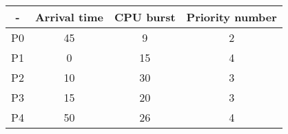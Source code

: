 \begin{enumerate}
	\begin{latin}
		\begin{center}
			\begin{tabular}{||c| c c c||} 
				\hline
				- & Arrival time & ‫‪CPU burst & ‫‪Priority‬‬ ‫‪number‬‬ \\ [0.5ex] 
				\hline\hline
				P0 & 45 & 9 & 2 \\ 
				\hline
				P1 & 0 & 15 & 4 \\ 
				\hline
				P2 & 10 & 30 & 3 \\
				\hline
				P3 & 15 & 20 & 3 \\
				\hline
				P4 & 50 & 26 & 4 \\ [1ex] 
				\hline
			\end{tabular}
		\end{center}
	\end{latin}
\end{enumerate}


